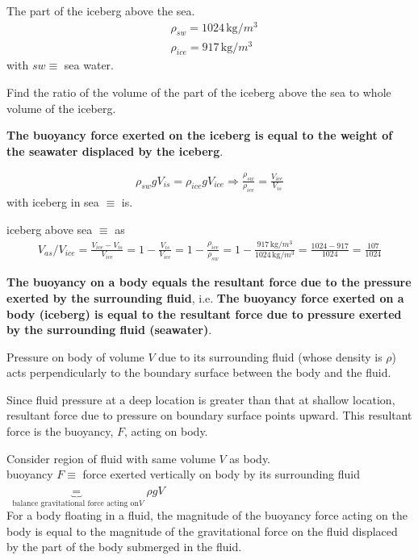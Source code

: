 \documentclass[10pt]{amsart}
\newcommand{\problemhead}[1]
  {
   \noindent{\small\bf Problem #1.}
   }
\newcommand{\solutionhead}[1]
  {
   \noindent{\small\bf Solution #1.}
   }
\begin{document}
\begin{multicols*}{2}
\problemhead{1.3} The part of the iceberg above the sea.
\[
\begin{aligned}
& \rho_{sw} = 1024 \, \text{kg}/m^3 \\
& \rho_{ice} = 917 \, \text{kg}/m^3
\end{aligned}
\]
with $sw \equiv$ sea water.

Find the ratio of the volume of the part of the iceberg above the sea to whole volume of the iceberg.

\solutionhead{1.3}

\textbf{The buoyancy force exerted on the iceberg is equal to the weight of the seawater displaced by the iceberg}.

\[
\begin{gathered}
	\rho_{sw} g V_{is} = \rho_{ice} gV_{ice} \Longrightarrow \frac{ \rho_{sw} }{ \rho_{ice}} = \frac{V_{ice}}{ V_{is}} 
\end{gathered}
\]
with iceberg in sea $\equiv$ is.

iceberg above sea $\equiv$ as
\[
\begin{gathered}
V_{as} / V_{ice} = \frac{V_{ice} - V_{is}}{ V_{ice}} = 1 - \frac{V_{is}}{V_{ice}} = 1 - \frac{ \rho_{ice}}{ \rho_{sw}} = 1 - \frac{917 \, \text{kg}/m^3}{ 1024 \, \text{kg}/ m^3 } = \frac{ 1024 - 917 }{ 1024} = \frac{107 } {1024} 
\end{gathered}
\]

\textbf{The buoyancy on a body equals the resultant force due to the pressure exerted by the surrounding fluid}, i.e.
\textbf{The buoyancy force exerted on a body (iceberg) is equal to the resultant force due to pressure exerted by the surrounding fluid (seawater)}.


Pressure on body of volume $V$ due to its surrounding fluid (whose density is $\rho$) acts perpendicularly to the boundary surface between the body and the fluid. 

Since fluid pressure at a deep location is greater than that at shallow location, resultant force due to pressure on boundary surface points upward. This resultant force is the buoyancy, $F$, acting on body. 

Consider region of fluid with same volume $V$ as body. \\

buoyancy $F \equiv$ force exerted vertically on body by its surrounding fluid $ \underbrace{ =}_{ \text{ balance gravitational force acting on} V }  \rho g V$ \\

For a body floating in a fluid, the magnitude of the buoyancy force acting on the body is equal to the magnitude of the gravitational force on the fluid displaced by the part of the body submerged in the fluid.




\end{multicols*}
\end{document}
